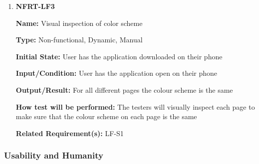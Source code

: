 \documentclass[12pt, titlepage]{article}
\begin{document}
\begin{enumerate}
\item{\textbf{NFRT-LF3}}

\textbf{Name:} Visual inspection of color scheme

\textbf{Type:} Non-functional, Dynamic, Manual
					
\textbf{Initial State:} User has the application downloaded on their phone
					
\textbf{Input/Condition:} User has the application open on their phone
					
\textbf{Output/Result:} For all different pages the colour scheme is the same

\textbf{How test will be performed:} The testers will visually inspect each page to make sure that the colour scheme on each page is the same

\textbf{Related Requirement(s):} LF-S1
\end{enumerate}

\subsubsection{Usability and Humanity}
\end{document}
